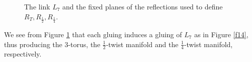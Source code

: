 \documentclass{amsart}
\theoremstyle{definition}
\theoremstyle{remark}
\begin{document}
\begin{figure}

    \caption{The link $L_7$ and the fixed planes of the reflections used to define $R_T,R_{\frac{1}{2}},R_{\frac{1}{4}}$.}\label{f15}
\end{figure}

We see from Figure \ref{f15} that each gluing induces a gluing of $L_7$ as in Figure \ref{f14}, thus producing the $3$-torus, the $\frac{1}{2}$-twist manifold and the $\frac{1}{4}$-twist manifold, respectively.
\end{document}
